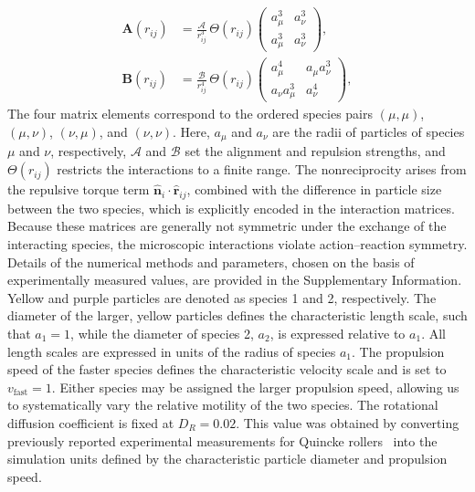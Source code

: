 \documentclass[aps,pre,twocolumn,amsmath,amssymb,notitlepage,superscriptaddress,longbibliography,nofootinbib,10pt]{revtex4-1}
\begin{document}
\begin{align}
    \mathbf{A}(r_{ij})
    &=
    \frac{\mathcal{A}}{r_{ij}^3}\,
    \Theta(r_{ij})
    \begin{pmatrix}
        a_\mu^3 & a_\nu^3 \\
        a_\mu^3 & a_\nu^3
    \end{pmatrix},
    \label{eq:alignment_matrix}
    \\
    \mathbf{B}(r_{ij})
    &=
    \frac{\mathcal{B}}{r_{ij}^4}\,
    \Theta(r_{ij})
    \begin{pmatrix}
        a_\mu^4          & a_\mu a_\nu^3 \\
        a_\nu a_\mu^3    & a_\nu^4
    \end{pmatrix},
    \label{eq:repulsion_matrix}
\end{align}
The four matrix elements correspond to the ordered species pairs $(\mu,\mu)$, $(\mu,\nu)$, $(\nu,\mu)$, and $(\nu,\nu)$. Here, $a_\mu$ and $a_\nu$ are the radii of particles of species $\mu$ and $\nu$, respectively, $\mathcal{A}$ and $\mathcal{B}$ set the alignment and repulsion strengths, and $\Theta(r_{ij})$ restricts the interactions to a finite range. The nonreciprocity arises from the repulsive torque term $\hat{\mathbf{n}}_i\cdot\hat{\mathbf{r}}_{ij}$, combined with the difference in particle size between the two species, which is explicitly encoded in the interaction matrices. Because these matrices are generally not symmetric under the exchange of the interacting species, the microscopic interactions violate action–reaction symmetry.
Details of the numerical methods and parameters, chosen on the basis of experimentally measured values, are provided in the Supplementary Information. Yellow and purple particles are denoted as species 1 and 2, respectively. The diameter of the larger, yellow particles defines the characteristic length scale, such that $a_1=1$, while the diameter of species 2, $a_2$, is expressed relative to $a_1$. All length scales are expressed in units of the radius of species $a_1$.
The propulsion speed of the faster species defines the characteristic velocity scale and is set to $v_{\mathrm{fast}}=1$. Either species may be assigned the larger propulsion speed, allowing us to systematically vary the relative motility of the two species. The rotational diffusion coefficient is fixed at $D_R=0.02$. This value was obtained by converting previously reported experimental measurements for Quincke rollers~\cite{PhysRevLett.131.178304} into the simulation units defined by the characteristic particle diameter and propulsion speed.
 
\end{document}
